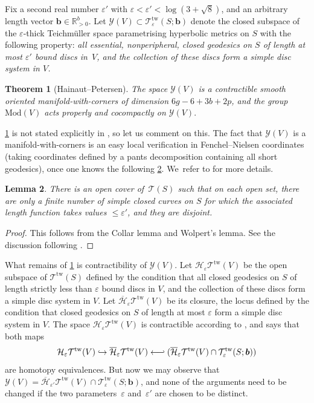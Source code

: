 \documentclass[JEP,XML,SOM,Unicode,NoFloatCountersInSection,published]{cedram}
\newcommand\hto{\mathrel{\lhook\joinrel\to}}
\newcommand\from{\mathchoice{\longleftarrow}{\leftarrow}{\leftarrow}{\leftarrow}}
\newcommand\hfrom{\mathrel{\from\joinrel\rhook}}
\newcommand{\bb}{\boldsymbol{b}}
\theoremstyle{plain}
\newtheorem{thm}{Theorem}[section]
\newtheorem{lem}[thm]{Lemma}
\theoremstyle{definition}
\let\eps\varepsilon
\newcommand{\T}{\mathcal T}
\newcommand{\TT}{\mathcal T^{\mathrm{tw}}}
\newcommand{\Y}{\mathcal Y}
\newcommand{\hmod}{\mathrm{Mod}}
\begin{document}
Fix a second real number $\eps'$ with $\eps<\eps'<\log(3+\sqrt 8)$, and an arbitrary length vector $\bb \in \mathbb R^b_{>0}$. Let $\Y(V) \subset \TT_\eps(S;\bb)$ denote the closed subspace of the $\eps$-thick Teichmüller space parametrising hyperbolic metrics on $S$ with the following property:
\emph{all essential, nonperipheral, closed geodesics on $S$ of length at most $\eps'$ bound discs in~$V$, and the collection of these discs form a simple disc system in $V$.}

\begin{thm}[Hainaut--Petersen]\label{hp}
The space $\Y(V)$ is a contractible smooth oriented manifold-with-corners of dimension $6g-6+3b+2p$, and the group $\hmod(V)$ acts properly and cocompactly on $\Y(V).$
\end{thm}

\cref{hp} is not stated explicitly in \cite{hainautpetersen}, so let us comment on this. The fact that $\Y(V)$ is a manifold-with-corners is an easy local verification in Fenchel--Nielsen coordinates (taking coordinates defined by a pants decomposition containing all short geodesics), once one knows the following \cref{lemma:wolpert}. We~refer to \cite[\S 2]{hainautpetersen} for more details.

\begin{lem}\label{lemma:wolpert}
There is an open cover of $\,\T(S)$ such that on each open set, there are only a finite number of simple closed curves on $S$ for which the associated length function takes values $\leq \eps'$, and they are disjoint.
\end{lem}

\begin{proof}This follows from the Collar lemma and Wolpert's lemma. See the discussion following \cite[Th.\,2.3]{hainautpetersen}.
\end{proof}
What remains of \cref{hp} is contractibility of $\Y(V)$. Let $\mathcal{H}_\eps\TT(V)$ be the open subspace of $\TT(S)$ defined by the condition that all closed geodesics on $S$ of length strictly less than $\eps$ bound discs in $V$, and the collection of these discs form a simple disc system in $V$. Let $\overline{\mathcal{H}}_\eps\TT(V)$ be its closure, \ie the locus defined by the condition that closed geodesics on $S$ of length at most $\eps$ form a simple disc system in $V$. The space $\mathcal{H}_\eps\TT(V)$ is contractible according to \cite[Th.\,1.4]{hainautpetersen}, and \cite[Prop.\,3.5]{hainautpetersen} says that both maps\vspace*{-3pt}\enlargethispage{.5\baselineskip}
\[
\mathcal{H}_\eps\TT(V) \hto \overline{\mathcal{H}}_\eps\TT(V) \hfrom (\overline{\mathcal{H}}_\eps\TT(V) \cap \TT_\eps(S;\bb))
\]
are homotopy equivalences. But now we may observe that $\Y(V) = \overline{\mathcal{H}}_{\eps'}\TT(V) \cap \TT_\eps(S;\bb)$, and none of the arguments need to be changed if the two parameters~$\eps$ and~$\eps'$ are chosen to be distinct.
\end{document}
